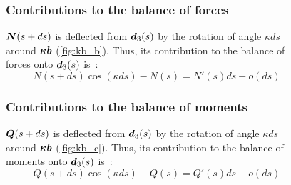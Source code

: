 \begin{figure}[p]
	\begin{fullpage}
	\subsubsection{Contributions to the balance of forces}
	\vspace{10pt}
	$\boldsymbol{N}(s+ds)$ is deflected from $\boldsymbol{d}_3(s)$ by the rotation of angle $\kappa ds$ around $\boldsymbol{\kappa b}$ (\cref{fig:kb_b}). Thus, its contribution to the balance of forces onto $\boldsymbol{d}_3(s)$ is~: 
	\begin{equation*}
		N(s+ds) \cos(\kappa ds) - N(s) = N'(s) ds + o(ds)
	\end{equation*}	
	\vspace{10pt}
	
	\subsubsection{Contributions to the balance of moments}
	\vspace{10pt}
	$\boldsymbol{Q}(s+ds)$ is deflected from $\boldsymbol{d}_3(s)$ by the rotation of angle $\kappa ds$ around $\boldsymbol{\kappa b}$ (\cref{fig:kb_c}). Thus, its contribution to the balance of moments onto $\boldsymbol{d}_3(s)$ is~: 
	\begin{equation*}
		Q(s+ds) \cos(\kappa ds) - Q(s) = Q'(s) ds + o(ds)
	\end{equation*}	
	  \end{fullpage}
\end{figure}

 
